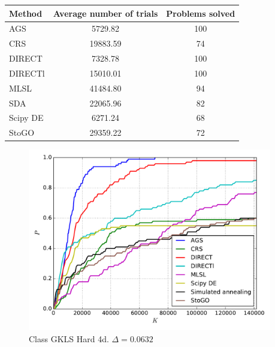 \documentclass[a4paper]{article}
\begin{document}
\begin{tabular}{lcc}
\hline
 Method   &  Average number of trials  &  Problems solved  \\
\hline
 AGS      &          5729.82           &        100        \\
 CRS      &          19883.59          &        74         \\
 DIRECT   &          7328.78           &        100        \\
 DIRECTl  &          15010.01          &        100        \\
 MLSL     &          41484.80          &        94         \\
 SDA      &          22065.96          &        82         \\
 Scipy DE &          6271.24           &        68         \\
 StoGO    &          29359.22          &        72         \\
\hline
\end{tabular}
\begin{figure}[H]
  \center
  \includegraphics[width=0.95\textwidth]{../experiments/gklsh4d_serg/cmc.pdf}
  \caption{Class GKLS Hard 4d. $\Delta=0.0632$}

\end{figure}
\end{document}
